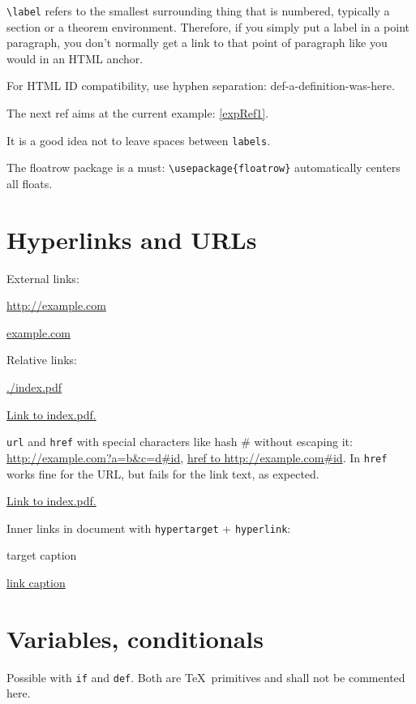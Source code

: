 \documentclass[12pt]{article}
\begin{document}
\lstinline|\label| refers to the smallest surrounding thing that is numbered, typically a section or a theorem environment. Therefore, if you simply put a label in a point paragraph, you don't normally get a link to that point of paragraph like you would in an HTML anchor.

For HTML ID compatibility, use hyphen separation: def-a-definition-was-here.

\begin{example}\label{expRef1}
The next ref aims at the current example: \ref{expRef1}.
\end{example}

It is a good idea not to leave spaces between \lstinline|labels|.

The floatrow package is a must: \lstinline|\usepackage{floatrow}| automatically centers all floats.

\section{Hyperlinks and URLs}\label{hyperlinks-urls}

External links:

\url{http://example.com}

\href{http://example.com}{example.com}

Relative links:

\url{./index.pdf}

\href{./index.pdf}{Link to index.pdf.}

\lstinline|url| and \lstinline|href| with special characters like hash \# without escaping it: \url{http://example.com?a=b&c=d#id}, \href{http://example.com?a=b&c=d#id}{href to http://example.com\#id}. In \lstinline|href| works fine for the URL, but fails for the link text, as expected.

\href{./index.pdf}{Link to index.pdf.}

Inner links in document with \lstinline|hypertarget| + \lstinline|hyperlink|:

\hypertarget{label}{target caption}

\hyperlink{label}{link caption}

\section{Variables, conditionals}\label{variables}

Possible with \lstinline|if| and \lstinline|def|. Both are \TeX\ primitives and shall not be commented here.
\end{document}
